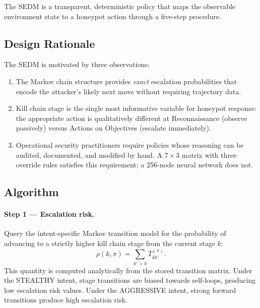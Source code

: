 The SEDM is a transparent, deterministic policy that maps the observable
environment state to a honeypot action through a five-step procedure.

\subsection{Design Rationale}

The SEDM is motivated by three observations:

\begin{enumerate}
  \item The Markov chain structure provides \emph{exact} escalation
        probabilities that encode the attacker's likely next move without
        requiring trajectory data.
  \item Kill chain stage is the single most informative variable for
        honeypot response: the appropriate action is qualitatively
        different at Reconnaissance (observe passively) versus
        Actions on Objectives (escalate immediately).
  \item Operational security practitioners require policies whose reasoning
        can be audited, documented, and modified by hand.
        A $7 \times 3$ matrix with three override rules satisfies this
        requirement; a 256-node neural network does not.
\end{enumerate}

\subsection{Algorithm}
\label{sec:sedm_alg}

\paragraph{Step 1 — Escalation risk.}
Query the intent-specific Markov transition model for the probability of
advancing to a strictly higher kill chain stage from the current stage $k$:
%
\begin{equation}
  \rho(k, \pi) = \sum_{k' > k} T^{(\pi)}_{kk'}.
  \label{eq:esc_risk_meth}
\end{equation}
%
This quantity is computed analytically from the stored transition matrix.
Under the STEALTHY intent, stage transitions are biased towards self-loops,
producing low escalation risk values.
Under the AGGRESSIVE intent, strong forward transitions produce high
escalation risk.


